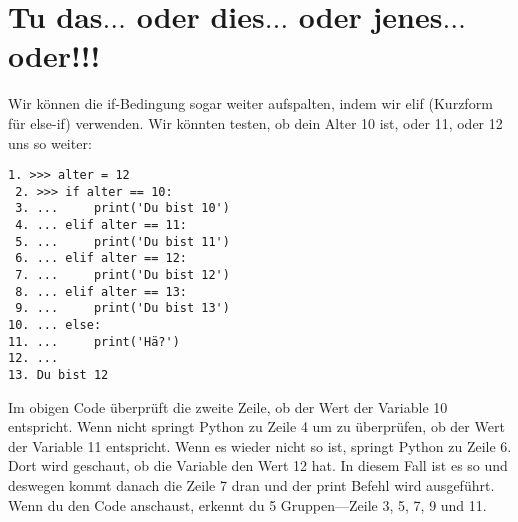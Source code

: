\section{Tu das$\ldots$ oder dies$\ldots$ oder jenes$\ldots$ oder!!!}

Wir können die if-Bedingung sogar weiter aufspalten, indem wir elif (Kurzform für else-if) verwenden. Wir könnten testen, ob dein Alter 10 ist, oder 11, oder 12 uns so weiter:

\begin{Verbatim}[frame=single]
 1. >>> alter = 12
 2. >>> if alter == 10:
 3. ...     print('Du bist 10')
 4. ... elif alter == 11:
 5. ...     print('Du bist 11')
 6. ... elif alter == 12:
 7. ...     print('Du bist 12')
 8. ... elif alter == 13:
 9. ...     print('Du bist 13')
10. ... else:
11. ...     print('Hä?')
12. ...
13. Du bist 12
\end{Verbatim}

Im obigen Code überprüft die zweite Zeile, ob der Wert der Variable 10 entspricht. Wenn nicht springt Python zu Zeile 4 um zu überprüfen, ob der Wert der  Variable 11 entspricht. Wenn es wieder nicht so ist, springt Python zu Zeile 6. Dort wird geschaut, ob die Variable den Wert 12 hat. In diesem Fall ist es so und deswegen kommt danach die Zeile 7 dran und der print Befehl wird ausgeführt. Wenn du den Code anschaust, erkennt du 5 Gruppen---Zeile 3, 5, 7, 9 und 11.

